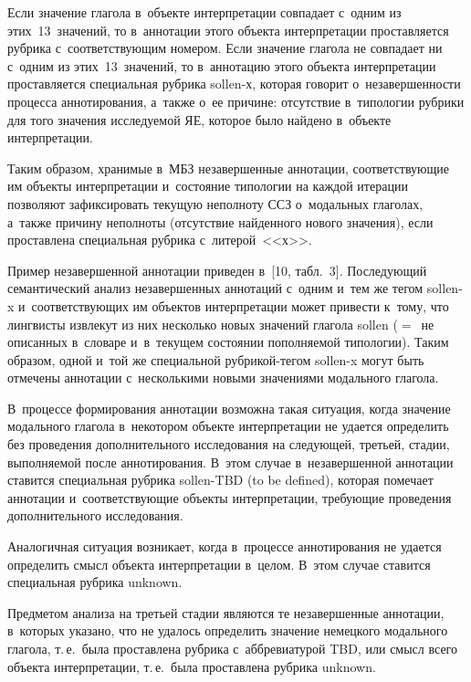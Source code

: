 \begin{multicols}{2}
  Если значение глагола в~объекте интерпретации совпадает с~одним из 
этих~13~значений, то в~аннотации этого объекта интерпретации проставляется 
рубрика с~соответствующим номером. Если значение глагола не совпадает ни 
с~одним из этих~13~значений, то в~аннотацию этого объекта интерпретации 
проставляется специальная руб\-ри\-ка sollen-х, которая говорит 
о~незавершенности процесса аннотирования, а~также о~ее причине: отсутствие 
в~типологии рубрики для того значения исследуемой ЯЕ, которое было 
найдено в~объекте интерпретации. 
  
  Таким образом, хранимые в~МБЗ незавершенные аннотации, 
соответствующие им объекты интерпретации и~состояние типологии на каждой 
итера\-ции позволяют зафиксировать текущую неполноту ССЗ о~модальных 
глаголах, а~также причину неполноты (отсутствие найденного нового 
значения), если проставлена специальная рубрика с~литерой~<<х>>. 
  
  Пример незавершенной аннотации приведен в~[10, табл.~3]. 
Последующий семантический анализ незавершенных аннотаций с~одним и~тем 
же тегом sollen-x и~соответствующих им объектов интерпретации может 
привести к~тому, что лингвисты извлекут из них несколько новых значений 
глагола sollen ($=$~не описанных в~словаре и~в~текущем состоянии 
пополняемой типологии). Таким образом, одной и~той же специальной  
руб\-ри\-кой-те\-гом \mbox{sollen-x} могут быть отмечены аннотации с~несколькими 
новыми значениями модального глагола.
  
  В~процессе формирования аннотации возможна такая ситуация, когда 
значение модального глагола в~некотором объекте интерпретации не удается 
определить без проведения дополнительного исследования на сле\-ду\-ющей, 
третьей, стадии, вы\-пол\-ня\-емой после аннотирования. В~этом случае 
в~незавершенной аннотации ставится специальная рубрика sollen-TBD (to be 
defined), которая помечает аннотации и~соответствующие объекты 
интерпретации, требующие проведения дополнительного исследования. 

Аналогичная ситуация возникает, когда в~процессе аннотирования не удается 
определить смысл объекта интерпретации в~целом. В~этом случае ставится 
специальная рубрика unknown.
  
  Предметом анализа на третьей стадии являются те незавершенные 
аннотации, в~которых указано, что не удалось определить значение немецкого 
модального глагола, т.\,е.\ была проставлена рубрика с~аббревиатурой TBD, или 
смысл всего объекта интерпретации, т.\,е.\ была проставлена рубрика unknown.
  

\end{multicols}
